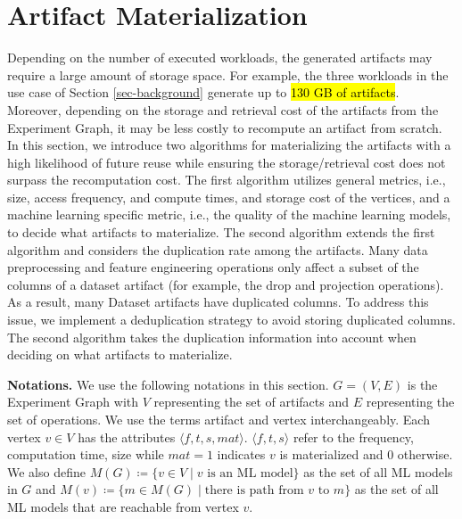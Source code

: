 \section{Artifact Materialization}\label{sec-materialization}
Depending on the number of executed workloads, the generated artifacts may require a large amount of storage space.
For example, the three workloads in the use case of Section \ref{sec-background} generate up to \hl{130 GB of artifacts}.
Moreover, depending on the storage and retrieval cost of the artifacts from the Experiment Graph, it may be less costly to recompute an artifact from scratch.
In this section, we introduce two algorithms for materializing the artifacts with a high likelihood of future reuse while ensuring the storage/retrieval cost does not surpass the recomputation cost.
The first algorithm utilizes general metrics, i.e., size, access frequency, and compute times, and storage cost of the vertices, and a machine learning specific metric, i.e., the quality of the machine learning models, to decide what artifacts to materialize.
The second algorithm extends the first algorithm and considers the duplication rate among the artifacts.
Many data preprocessing and feature engineering operations only affect a subset of the columns of a dataset artifact (for example, the drop and projection operations).
As a result, many Dataset artifacts have duplicated columns.
To address this issue, we implement a deduplication strategy to avoid storing duplicated columns.
The second algorithm takes the duplication information into account when deciding on what artifacts to materialize.

\textbf{Notations. }
We use the following notations in this section.
$G = (V,E)$ is the Experiment Graph with $V$ representing the set of artifacts and $E$ representing the set of operations.
We use the terms artifact and vertex interchangeably.
Each vertex $v \in V$ has the attributes $\langle f, t, s, mat \rangle$.
$\langle f, t, s \rangle$ refer to the frequency, computation time, size while $mat=1$ indicates $v$ is materialized and $0$ otherwise.
We also define $ M(G) \coloneqq  \{v \in V \mid v \text{ is an ML model}\}$ as the set of all ML models in $G$ and $ M(v) \coloneqq  \{m \in M(G) \mid\text{there is path from } v \text{ to } m\}$ as the set of all ML models that are reachable from vertex $v$.

